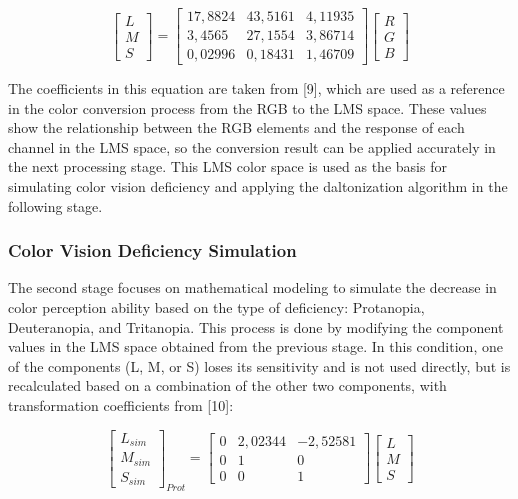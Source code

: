 \begin{equation}
\begin{bmatrix} L \\ M \\ S \end{bmatrix} =
\begin{bmatrix} 17{,}8824 & 43{,}5161 & 4{,}11935 \\ 3{,}4565 & 27{,}1554 & 3{,}86714 \\ 0{,}02996 & 0{,}18431 & 1{,}46709 \end{bmatrix}
\begin{bmatrix} R \\ G \\ B \end{bmatrix}
\end{equation}

The coefficients in this equation are taken from [9], which are used as a reference in the color conversion process from the RGB to the LMS space. These values show the relationship between the RGB elements and the response of each channel in the LMS space, so the conversion result can be applied accurately in the next processing stage. This LMS color space is used as the basis for simulating color vision deficiency and applying the daltonization algorithm in the following stage.

\subsubsection{Color Vision Deficiency Simulation}

The second stage focuses on mathematical modeling to simulate the decrease in color perception ability based on the type of deficiency: Protanopia, Deuteranopia, and Tritanopia. This process is done by modifying the component values in the LMS space obtained from the previous stage. In this condition, one of the components (L, M, or S) loses its sensitivity and is not used directly, but is recalculated based on a combination of the other two components, with transformation coefficients from [10]:

\begin{equation}
\begin{bmatrix} L_{sim} \\ M_{sim} \\ S_{sim} \end{bmatrix}_{Prot} =
\begin{bmatrix} 0 & 2{,}02344 & -2{,}52581 \\ 0 & 1 & 0 \\ 0 & 0 & 1 \end{bmatrix}
\begin{bmatrix} L \\ M \\ S \end{bmatrix}
\end{equation}

